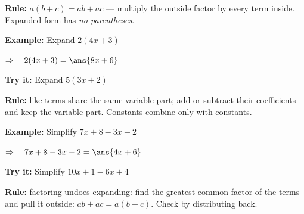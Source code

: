 \documentclass[12pt]{article}
\begin{document}


\begin{formulabox}
\textbf{Rule:} \quad $a(b + c) = ab + ac$ \quad --- multiply the outside factor by
every term inside. Expanded form has \emph{no parentheses}.
\end{formulabox}

\begin{examplebox}
\textbf{Example:} \quad Expand $2(4x + 3)$

$\Rightarrow\quad 2(4x + 3) = \ans{8x + 6}$
\end{examplebox}

\begin{tryitbox}
\textbf{Try it:} \quad Expand $5(3x + 2)$\\[2pt]
\end{tryitbox}


\begin{formulabox}
\textbf{Rule:} like terms share the same variable part; add or subtract their
coefficients and keep the variable part. Constants combine only with constants.
\end{formulabox}

\begin{examplebox}
\textbf{Example:} \quad Simplify $7x + 8 - 3x - 2$

$\Rightarrow\quad 7x + 8 - 3x - 2 = \ans{4x + 6}$
\end{examplebox}

\begin{tryitbox}
\textbf{Try it:} \quad Simplify $10x + 1 - 6x + 4$\\[2pt]
\end{tryitbox}


\begin{formulabox}
\textbf{Rule:} factoring undoes expanding: find the greatest common factor of the
terms and pull it outside: $ab + ac = a(b + c)$. Check by distributing back.
\end{formulabox}
\end{document}
